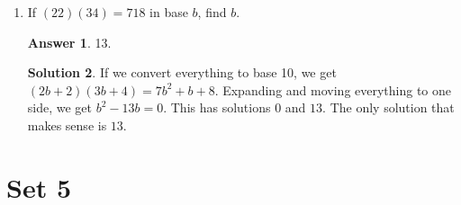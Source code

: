 \documentclass[11pt]{article}
\theoremstyle{definition}
\newtheorem*{solution}{Solution}
\newtheorem*{answer}{Answer}
\begin{document}
\begin{enumerate}
\begin{solution}
\end{solution}

\item If $(22)(34) = 718$ in base $b$, find $b$.

\begin{answer}
13.
\end{answer}
\begin{solution} If we convert everything to base 10, we get $(2b+2)(3b+4) = 7b^2+b+8$. Expanding and moving everything to one side, we get $b^2 - 13b = 0$. This has solutions $0$ and $13$. The only solution that makes sense is $\boxed{13}$.
\end{solution}

\end{enumerate}

\section*{Set 5}
\end{document}
